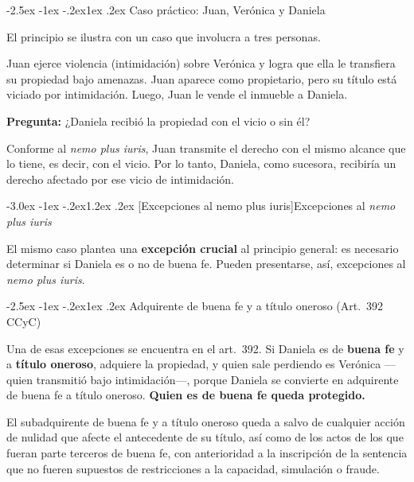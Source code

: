 \documentclass[12pt,oneside]{book}
\makeatletter
\renewcommand\section{\@startsection{section}{1}{\z@}%
  {-3.0ex \@plus -1ex \@minus -.2ex}{1.2ex \@plus .2ex}%
  {\normalfont\large\bfseries\color{acento}}}
\renewcommand\subsection{\@startsection{subsection}{2}{\z@}%
  {-2.5ex \@plus -1ex \@minus -.2ex}{1ex \@plus .2ex}%
  {\normalfont\normalsize\bfseries}}
\makeatother
\begin{document}
\subsection{Caso práctico: Juan, Verónica y Daniela}

El principio se ilustra con un caso que involucra a tres personas.

\begin{ejemplo}
Juan ejerce violencia (intimidación) sobre Verónica y logra que ella le transfiera su propiedad bajo amenazas. Juan aparece como propietario, pero su título está viciado por intimidación. Luego, Juan le vende el inmueble a Daniela.

\smallskip
\textbf{Pregunta:} ¿Daniela recibió la propiedad con el vicio o sin él?

\smallskip
Conforme al \textit{nemo plus iuris}, Juan transmite el derecho con el mismo alcance que lo tiene, es decir, con el vicio. Por lo tanto, Daniela, como sucesora, recibiría un derecho afectado por ese vicio de intimidación.
\end{ejemplo}

\section[Excepciones al nemo plus iuris]{Excepciones al \textit{nemo plus iuris}}

El mismo caso plantea una \textbf{excepción crucial} al principio general: es necesario determinar si Daniela es o no de buena fe. Pueden presentarse, así, excepciones al \textit{nemo plus iuris}.

\subsection{Adquirente de buena fe y a título oneroso (Art.~392 CCyC)}

Una de esas excepciones se encuentra en el art.~392. Si Daniela es de \textbf{buena fe} y a \textbf{título oneroso}, adquiere la propiedad, y quien sale perdiendo es Verónica ---quien transmitió bajo intimidación---, porque Daniela se convierte en adquirente de buena fe a título oneroso. \textbf{Quien es de buena fe queda protegido.}

\begin{regla}
El subadquirente de buena fe y a título oneroso queda a salvo de cualquier acción de nulidad que afecte el antecedente de su título, así como de los actos de los que fueran parte terceros de buena fe, con anterioridad a la inscripción de la sentencia que no fueren supuestos de restricciones a la capacidad, simulación o fraude.
\end{regla}
\end{document}
